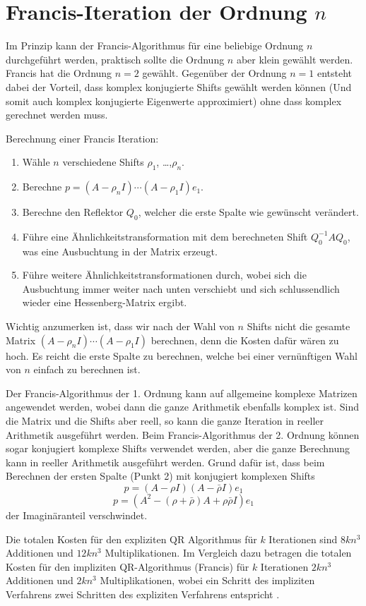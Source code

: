 \section{Francis-Iteration der Ordnung $n$}
Im Prinzip kann der Francis-Algorithmus für eine beliebige Ordnung $n$ durchgeführt werden, praktisch sollte die Ordnung $n$ aber klein gewählt werden.
Francis hat die Ordnung $n=2$ gewählt.
Gegenüber der Ordnung $n=1$ entsteht dabei der Vorteil, dass komplex konjugierte Shifts gewählt werden können (Und somit auch komplex konjugierte Eigenwerte approximiert) ohne dass komplex gerechnet werden muss.

Berechnung einer Francis Iteration:
\begin{enumerate}
	\item Wähle $n$ verschiedene Shifts $\rho_{1}$, \dots ,$\rho_{n}$.
	\item Berechne $p= (A - \rho_{n}I) \cdots (A - \rho_{1}I)e_{1}$.
	\item Berechne den Reflektor $Q_{0}$, welcher die erste Spalte wie gewünscht verändert.
	\item Führe eine Ähnlichkeitstransformation mit dem berechneten Shift $Q_{0}^{-1}AQ_{0}$, was eine Ausbuchtung in der Matrix erzeugt.
	\item Führe weitere Ähnlichkeitstransformationen durch, wobei sich die Ausbuchtung immer weiter nach unten verschiebt und sich schlussendlich wieder eine Hessenberg-Matrix ergibt.
\end{enumerate}

Wichtig anzumerken ist, dass wir nach der Wahl von $n$ Shifts nicht die gesamte Matrix $(A - \rho_{n}I) \cdots (A - \rho_{1}I)$ berechnen, denn die Kosten dafür wären zu hoch. Es reicht die erste Spalte zu berechnen, welche bei einer vernünftigen Wahl von $n$ einfach zu berechnen ist.

Der Francis-Algorithmus der 1. Ordnung kann auf allgemeine komplexe Matrizen angewendet werden, wobei dann die ganze Arithmetik ebenfalls komplex ist.
Sind die Matrix und die Shifts aber reell, so kann die ganze Iteration in reeller Arithmetik ausgeführt werden.
Beim Francis-Algorithmus der 2. Ordnung können sogar konjugiert komplexe Shifts verwendet werden, aber die ganze Berechnung kann in reeller Arithmetik ausgeführt werden. Grund dafür ist, dass beim Berechnen der ersten Spalte (Punkt 2) mit konjugiert komplexen Shifts
\begin{equation}
p= (A - \rho I)(A - \bar{\rho} I)e_{1}
\end{equation}
\begin{equation}
p= (A^2-(\rho+\bar{\rho})A+\rho\bar{\rho}I)e_{1}
\end{equation}
der Imaginäranteil verschwindet.

Die totalen Kosten für den expliziten QR Algorithmus für $k$ Iterationen sind $8kn^{3}$ Additionen und $12kn^{3}$ Multiplikationen.
Im Vergleich dazu betragen die totalen Kosten für den impliziten QR-Algorithmus (Francis) für $k$ Iterationen $2kn^{3}$ Additionen und $2kn^{3}$ Multiplikationen, wobei ein Schritt des impliziten Verfahrens zwei Schritten des expliziten Verfahrens entspricht \cite{francis:EthSeminar}.
